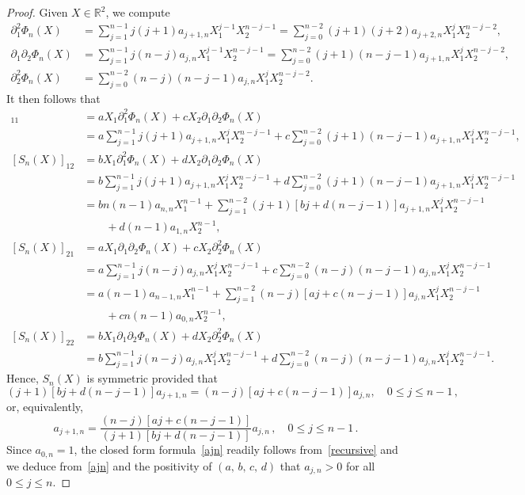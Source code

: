 \documentclass[10pt]{amsart}
\theoremstyle{definition}\newtheorem{defi}[theo]{Definition}\newtheorem{rema}[theo]{Remark}\newtheorem{exam}[theo]{Example}\newtheorem{exem}[theo]{Example}\newtheorem{nota}[theo]{Notation}
\newcommand{\bbR}{\mathbb{R}}
\begin{document}
\begin{proof}
Given $X\in\bbR^2$, we compute
\begin{align*}
\partial_1^2 \Phi_n(X) & = \sum_{j=1}^{n-1} j(j+1) a_{j+1,n} X_1^{j-1} X_2^{n-j-1} = \sum_{j=0}^{n-2} (j+1)(j+2) a_{j+2,n} X_1^j X_2^{n-j-2}, \\
\partial_1 \partial_2 \Phi_n(X) & = \sum_{j=1}^{n-1} j(n-j) a_{j,n} X_1^{j-1} X_2^{n-j-1} = \sum_{j=0}^{n-2} (j+1)(n-j-1) a_{j+1,n} X_1^j X_2^{n-j-2}, \\
\partial_2^2 \Phi_n(X) & = \sum_{j=0}^{n-2} (n-j)(n-j-1) a_{j,n} X_1^j X_2^{n-j-2}.
\end{align*}
It then follows that
\begin{align*}
[S_n(X)]_{11} & = a X_1 \partial_1^2 \Phi_n(X) + c X_2 \partial_1 \partial_2 \Phi_n(X)\\
& = a \sum_{j=1}^{n-1} j(j+1) a_{j+1,n} X_1^j X_2^{n-j-1} + c \sum_{j=0}^{n-2} (j+1)(n-j-1) a_{j+1,n} X_1^j X_2^{n-j-1}, \\
[S_n(X)]_{12} & = bX_1 \partial_1^2\Phi_n(X) + d X_2 \partial_1 \partial_2 \Phi_n(X) \\
& = b \sum_{j=1}^{n-1} j(j+1) a_{j+1,n} X_1^j X_2^{n-j-1} + d \sum_{j=0}^{n-2} (j+1)(n-j-1) a_{j+1,n} X_1^j X_2^{n-j-1}\\
& = bn(n-1)a_{n,n}X_1^{n-1} +\sum_{j=1}^{n-2} (j+1)[bj+d(n-j-1)] a_{j+1,n} X_1^j X_2^{n-j-1} \\
& \qquad + d(n-1) a_{1,n} X_2^{n-1},\\
[S_n(X)]_{21} & = aX_1 \partial_1 \partial_2 \Phi_n(X) + c X_2 \partial_2^2 \Phi_n(X)\\
& = a \sum_{j=1}^{n-1} j(n-j) a_{j,n} X_1^{j} X_2^{n-j-1} +c \sum_{j=0}^{n-2} (n-j)(n-j-1) a_{j,n} X_1^j X_2^{n-j-1}\\
& = a (n-1)a_{n-1,n}X_1^{n-1}+\sum_{j=1}^{n-2} (n-j)[aj+c(n-j-1)] a_{j,n} X_1^{j} X_2^{n-j-1} \\
& \qquad + c n (n-1)a_{0,n} X_2^{n-1},\\
[S_n(X)]_{22} & = b X_1 \partial_1 \partial_2 \Phi_n(X) + d X_2 \partial_2^2 \Phi_n(X)\\
& = b \sum_{j=1}^{n-1} j(n-j) a_{j,n} X_1^{j} X_2^{n-j-1} + d \sum_{j=0}^{n-2} (n-j)(n-j-1) a_{j,n} X_1^j X_2^{n-j-1}.
\end{align*}
Hence, $S_n(X)$ is symmetric provided that
\begin{equation*}
(j+1)[bj+d(n-j-1)]a_{j+1,n}= (n-j)[aj+c(n-j-1)] a_{j,n},\quad 0\leq j\leq n-1\,,
\end{equation*}
or, equivalently,
\begin{equation}\label{recursive}
a_{j+1,n} = \frac{(n-j)[aj+c(n-j-1)]}{(j+1)[bj+d(n-j-1)]} a_{j,n}\,,\quad 0\leq j\leq n-1\,.
\end{equation}
Since $a_{0,n}=1$, the closed form formula~\eqref{ajn} readily follows from~\eqref{recursive} and we deduce from~\eqref{ajn} and the positivity of $(a,\,b,\,c,\, d)$ that $a_{j,n}>0$ for all $0\leq j\leq n$.
\end{proof}
\end{document}
